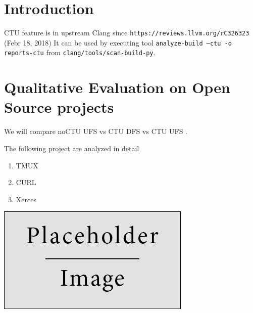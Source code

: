 \documentclass[a0,portrait]{a0poster}
\begin{document}
\begin{multicols}{2}
\begin{abstract}
\end{abstract}


\color{SaddleBrown} %

\section*{Introduction}
CTU feature is in upstream Clang since \texttt{https://reviews.llvm.org/rC326323} (Febr 18, 2018)
It can be used by executing tool \texttt{analyze-build --ctu -o reports-ctu} from \texttt{clang/tools/scan-build-py}.


\color{DarkSlateGray} %

\section*{Qualitative Evaluation on Open Source projects}

We will compare noCTU UFS vs CTU DFS vs CTU UFS .


The following project are analyzed in detail


\begin{enumerate}
\item TMUX
\item CURL
\item Xerces
\end{enumerate}


\begin{center}\vspace{1cm}
\includegraphics[width=0.8\linewidth]{placeholder}
\end{center}\vspace{1cm}


\end{multicols}
\end{document}
